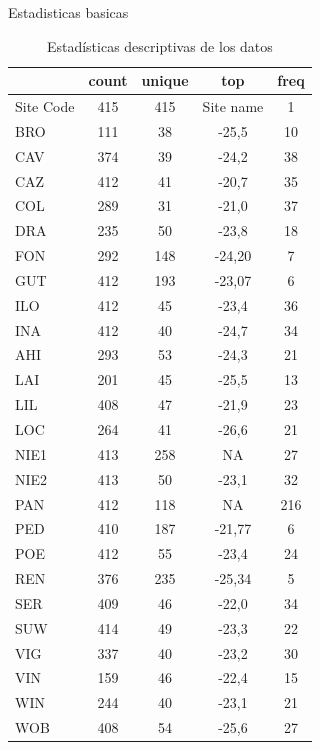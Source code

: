 \documentclass[a4paper,11pt]{article}
\begin{document}
Estadisticas basicas
\begin{table}[ht]
    \centering
    \caption{Estadísticas descriptivas de los datos}
    \label{tab:estadisticas_basicas}
    \begin{tabular}{|l|c|c|c|c|}
        \hline
        & count & unique & top & freq \\
        \hline
        Site Code & 415 & 415 & Site  name & 1 \\
        BRO & 111 & 38 & -25,5 & 10 \\
        CAV  & 374 & 39 & -24,2 & 38 \\
        CAZ  & 412 & 41 & -20,7 & 35 \\
        COL    & 289 & 31 & -21,0 & 37 \\
        DRA  & 235 & 50 & -23,8 & 18 \\
        FON  & 292 & 148 & -24,20 & 7 \\
        GUT  & 412 & 193 & -23,07 & 6 \\
        ILO & 412 & 45 & -23,4 & 36 \\
        INA  & 412 & 40 & -24,7 & 34 \\
        AHI & 293 & 53 & -24,3 & 21 \\
        LAI  & 201 & 45 & -25,5 & 13 \\
        LIL & 408 & 47 & -21,9 & 23 \\
        LOC  & 264 & 41 & -26,6 & 21 \\
        NIE1 & 413 & 258 & NA  & 27 \\
        NIE2 & 413 & 50 & -23,1 & 32 \\
        PAN  & 412 & 118 & NA  & 216 \\
        PED  & 410 & 187 & -21,77 & 6 \\
        POE  & 412 & 55 & -23,4 & 24 \\
        REN  & 376 & 235 & -25,34 & 5 \\
        SER & 409 & 46 & -22,0 & 34 \\
        SUW  & 414 & 49 & -23,3 & 22 \\
        VIG  & 337 & 40 & -23,2 & 30 \\
        VIN  & 159 & 46 & -22,4 & 15 \\
        WIN & 244 & 40 & -23,1 & 21 \\
        WOB  & 408 & 54 & -25,6 & 27 \\
        \hline
    \end{tabular}
\end{table}
\end{document}
